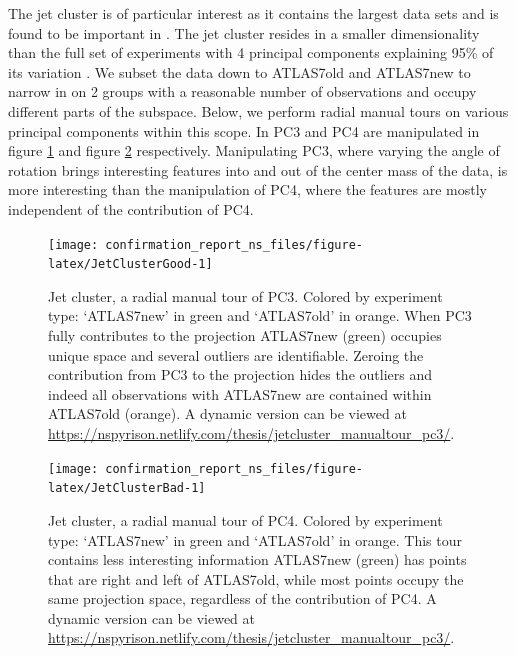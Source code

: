 \documentclass{monashthesis}
\begin{document}
The jet cluster is of particular interest as it contains the largest
data sets and is found to be important in
\textcite{wang_visualizing_2018}. The jet cluster resides in a smaller
dimensionality than the full set of experiments with 4 principal
components explaining 95\% of its variation
\autocite{cook_dynamical_2018}. We subset the data down to ATLAS7old and
ATLAS7new to narrow in on 2 groups with a reasonable number of
observations and occupy different parts of the subspace. Below, we
perform radial manual tours on various principal components within this
scope. In PC3 and PC4 are manipulated in figure \ref{fig:JetClusterGood}
and figure \ref{fig:JetClusterBad} respectively. Manipulating PC3, where
varying the angle of rotation brings interesting features into and out
of the center mass of the data, is more interesting than the
manipulation of PC4, where the features are mostly independent of the
contribution of PC4.










\begin{figure}

{\centering \texttt{[image: confirmation\_report\_ns\_files/figure-latex/JetClusterGood-1]} 

}

\caption{Jet cluster, a radial manual tour of PC3.
Colored by experiment type: `ATLAS7new' in green and `ATLAS7old' in
orange. When PC3 fully contributes to the projection ATLAS7new (green)
occupies unique space and several outliers are identifiable. Zeroing the
contribution from PC3 to the projection hides the outliers and indeed
all observations with ATLAS7new are contained within ATLAS7old (orange).
A dynamic version can be viewed at
\url{https://nspyrison.netlify.com/thesis/jetcluster_manualtour_pc3/}.}\label{fig:JetClusterGood}
\end{figure}









\begin{figure}

{\centering \texttt{[image: confirmation\_report\_ns\_files/figure-latex/JetClusterBad-1]} 

}

\caption{Jet cluster, a radial manual tour of PC4.
Colored by experiment type: `ATLAS7new' in green and `ATLAS7old' in
orange. This tour contains less interesting information ATLAS7new
(green) has points that are right and left of ATLAS7old, while most
points occupy the same projection space, regardless of the contribution
of PC4. A dynamic version can be viewed at
\url{https://nspyrison.netlify.com/thesis/jetcluster_manualtour_pc3/}.}\label{fig:JetClusterBad}
\end{figure}
\end{document}
